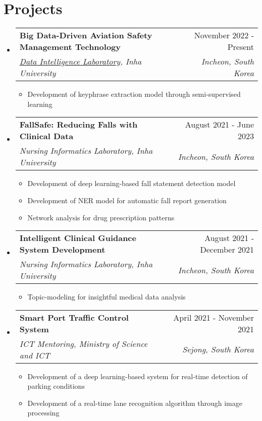 \documentclass[letterpaper,11pt]{article}
\makeatletter
\newcommand{\resumeSubheading}[4]{
  \vspace{-1pt}\item
    \begin{tabular*}{0.97\textwidth}{l@{\extracolsep{\fill}}r}
      #1 & #2 \\
      \textit{\small#3} & \textit{\small #4} \\
    \end{tabular*}\vspace{-5pt}
}
\makeatother
\begin{document}
    \section{Projects}
    \begin{itemize}[leftmargin=*,label=]
        \resumeSubheading
        {\textbf{Big Data-Driven Aviation Safety Management Technology}}{November 2022 - Present}
            {\href{http://dilab.inha.ac.kr/}{Data Intelligence Laboratory}, Inha University}{Incheon, South Korea}
            \begin{itemize}[label=\bullet]
                \item{Development of keyphrase extraction model through semi-supervised learning}
            \end{itemize}
        \resumeSubheading
        {\textbf{FallSafe: Reducing Falls with Clinical Data}}{August 2021 - June 2023}
            {Nursing Informatics Laboratory, Inha University}{Incheon, South Korea}
            \begin{itemize}[label=\bullet]
                \item{Development of deep learning-based fall statement detection model}
                \item{Development of NER model for automatic fall report generation}
                \item{Network analysis for drug prescription patterns}
            \end{itemize}
        \resumeSubheading
        {\textbf{Intelligent Clinical Guidance System Development}}{August 2021 - December 2021}
            {Nursing Informatics Laboratory, Inha University}{Incheon, South Korea}
            \begin{itemize}[label=\bullet]
                \item{Topic-modeling for insightful medical data analysis}
            \end{itemize}
        \resumeSubheading
        {\textbf{Smart Port Traffic Control System}}{April 2021 - November 2021}
            {ICT Mentoring, Ministry of Science and ICT}{Sejong, South Korea}
            \begin{itemize}[label=\bullet]
                \item{Development of a deep learning-based system for real-time detection of parking conditions}
                \item{Development of a real-time lane recognition algorithm through image processing}
            \end{itemize}
    \end{itemize}
    
\end{document}
